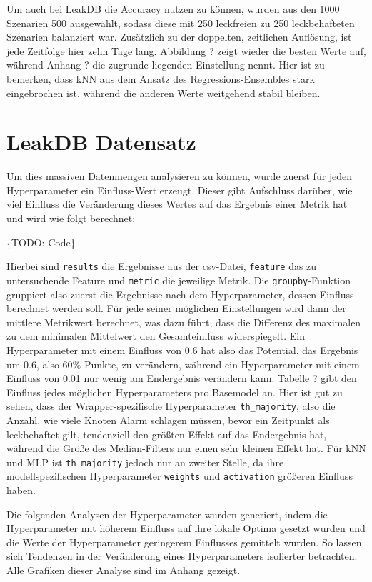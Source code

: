 Um auch bei LeakDB die Accuracy nutzen zu können, wurden aus den 1000 Szenarien 500 ausgewählt, sodass diese
 mit 250 leckfreien zu 250 leckbehafteten Szenarien balanziert war. Zusätzlich zu der doppelten, zeitlichen
 Auflösung, ist jede Zeitfolge hier zehn Tage lang. Abbildung ? zeigt wieder die besten Werte auf, während
 Anhang ? die zugrunde liegenden Einstellung nennt. Hier ist zu bemerken, dass kNN aus dem Ansatz des
 Regressions-Ensembles stark eingebrochen ist, während die anderen Werte weitgehend stabil bleiben.

\section{LeakDB Datensatz}

Um dies massiven Datenmengen analysieren zu können, wurde zuerst für jeden Hyperparameter ein Einfluss-Wert
 erzeugt. Dieser gibt Aufschluss darüber, wie viel Einfluss die Veränderung dieses Wertes auf das Ergebnis
 einer Metrik hat und wird wie folgt berechnet:

\{TODO: Code\}

Hierbei sind \texttt{results} die Ergebnisse aus der csv-Datei, \texttt{feature} das zu untersuchende Feature
 und \texttt{metric} die jeweilige Metrik. Die \texttt{groupby}-Funktion gruppiert also zuerst die Ergebnisse
 nach dem Hyperparameter, dessen Einfluss berechnet werden soll. Für jede seiner möglichen Einstellungen wird
 dann der mittlere Metrikwert berechnet, was dazu führt, dass die Differenz des maximalen zu dem minimalen
 Mittelwert den Gesamteinfluss widerspiegelt. Ein Hyperparameter mit einem Einfluss von 0.6 hat also das
 Potential, das Ergebnis um 0.6, also 60\%-Punkte, zu verändern, während ein Hyperparameter mit einem Einfluss
 von 0.01 nur wenig am Endergebnis verändern kann. Tabelle ? gibt den Einfluss jedes möglichen Hyperparameters
 pro Basemodel an. Hier ist gut zu sehen, dass der Wrapper-spezifische Hyperparameter \texttt{th\_majority},
 also die Anzahl, wie viele Knoten Alarm schlagen müssen, bevor ein Zeitpunkt als leckbehaftet gilt, tendenziell
 den größten Effekt auf das Endergebnis hat, während die Größe des Median-Filters nur einen sehr kleinen Effekt
 hat. Für kNN und MLP ist \texttt{th\_majority} jedoch nur an zweiter Stelle, da ihre modellspezifischen
 Hyperparameter \texttt{weights} und \texttt{activation} größeren Einfluss haben.

Die folgenden Analysen der Hyperparameter wurden generiert, indem die Hyperparameter mit höherem Einfluss auf
 ihre lokale Optima gesetzt wurden und die Werte der Hyperparameter geringerem Einflusses gemittelt wurden.
 So lassen sich Tendenzen in der Veränderung eines Hyperparameters isolierter betrachten. Alle Grafiken dieser
 Analyse sind im Anhang gezeigt.

